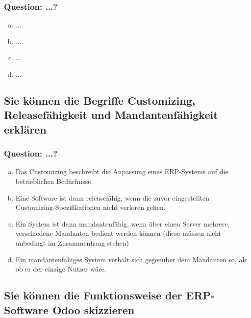 \documentclass{article}
\begin{document}
\begin{adjustwidth}{2em}{2em}
\begin{adjustwidth}{2em}{2em}
\begin{adjustwidth}{1em}{}
				\subsubsection*{Question: ...?}
				\begin{adjustwidth}{1em}{}
					\begin{enumerate}[(a)]
						\item ...
						\item ...
						\item ...
						\item ...
					\end{enumerate}
				\end{adjustwidth}
			\end{adjustwidth}
			\subsection{Sie können die Begriffe Customizing, Releasefähigkeit und Mandantenfähigkeit erklären}
			\begin{adjustwidth}{1em}{}
				\subsubsection*{Question: ...?}
				\begin{adjustwidth}{1em}{}
					\begin{enumerate}[(a)]
						\item Das Customizing beschreibt die Anpassung eines ERP-Systems auf die betrieblichen Bedürfnisse.
						\item Eine Software ist dann releasefähig, wenn die zuvor eingestellten Customizing-Spezifikationen nicht verloren gehen.
						\item Ein System ist dann mandantenfähig, wenn über einen Server mehrere, verschiedene Mandanten bedient werden können (diese müssen nicht unbedingt im Zusammenhang stehen)
						\item Ein mandantenfähiges System verhält sich gegenüber dem Mandanten so, als ob er der einzige Nutzer wäre.
					\end{enumerate}
				\end{adjustwidth}
			\end{adjustwidth}
			\subsection{Sie können die Funktionsweise der ERP-Software Odoo skizzieren}
			\begin{adjustwidth}{1em}{}

\end{adjustwidth}
\end{adjustwidth}
\end{adjustwidth}
\end{document}
